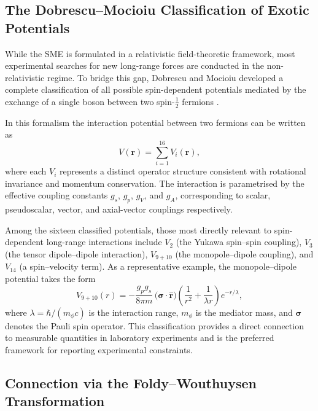 \documentclass[main]{subfiles}
\begin{document}
\subsection{The Dobrescu--Mocioiu Classification of Exotic Potentials}

While the SME is formulated in a relativistic field-theoretic framework, most
experimental searches for new long-range forces are conducted in the
non-relativistic regime. To bridge this gap, Dobrescu and Mocioiu developed a
complete classification of all possible spin-dependent potentials mediated by
the exchange of a single boson between two spin-$\frac{1}{2}$ fermions
\cite{Dobrescu2006}.

In this formalism the interaction potential between two fermions can be written
as
\begin{equation}
  V(\mathbf{r}) = \sum_{i=1}^{16} V_{i}(\mathbf{r}),
\end{equation}
where each $V_{i}$ represents a distinct operator structure consistent with
rotational invariance and momentum conservation. The interaction is
parametrised by the effective coupling constants $g_{s}$, $g_{p}$, $g_{V}$,
and $g_{A}$, corresponding to scalar, pseudoscalar, vector, and axial-vector
couplings respectively.

Among the sixteen classified potentials, those most directly relevant to
spin-dependent long-range interactions include $V_{2}$ (the Yukawa spin--spin
coupling), $V_{3}$ (the tensor dipole--dipole interaction), $V_{9+10}$ (the
monopole--dipole coupling), and $V_{14}$ (a spin--velocity term). As a
representative example, the monopole--dipole potential takes the form
\begin{equation}
  V_{9+10}(r)
  = -\frac{g_{p}g_{s}}{8\pi m}\,
    \bigl(\boldsymbol{\sigma}\cdot\hat{\mathbf{r}}\bigr)
    \!\left(\frac{1}{r^{2}} + \frac{1}{\lambda r}\right)
    e^{-r/\lambda},
\end{equation}
where $\lambda = \hbar/(m_{\phi}c)$ is the interaction range, $m_{\phi}$ is the
mediator mass, and $\boldsymbol{\sigma}$ denotes the Pauli spin operator. This
classification provides a direct connection to measurable quantities in
laboratory experiments and is the preferred framework for reporting experimental
constraints.

\subsection{Connection via the Foldy--Wouthuysen Transformation}
\end{document}
